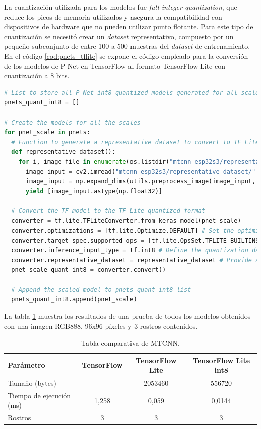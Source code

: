 La cuantización utilizada para los modelos fue \textit{full integer quantization}, que reduce los picos de memoria utilizados y asegura la compatibilidad con dispositivos de hardware que no pueden utilizar punto flotante. Para este tipo de cuantización se necesitó crear un \textit{dataset} representativo, compuesto por un pequeño subconjunto de entre 100 a 500 muestras del \textit{dataset} de entrenamiento. En el código \ref{cod:pnets_tflite} se expone el código empleado para la conversión de los modelos de P-Net en TensorFlow al formato TensorFlow Lite con cuantización a 8 bits.

\begin{lstlisting}[language=Python, label=cod:pnets_tflite, caption=Código para crear los modelos de P-Net con TensorFlow Lite con cuantización de 8 bits.]
# List to store all P-Net int8 quantized models generated for all scales
pnets_quant_int8 = []

# Create the models for all the scales
for pnet_scale in pnets:
  # Function to generate a representative dataset to convert to TF Lite quantized
  def representative_dataset():
    for i, image_file in enumerate(os.listdir("mtcnn_esp32s3/representative_dataset/")):
      image_input = cv2.imread("mtcnn_esp32s3/representative_dataset/" + image_file)
      image_input = np.expand_dims(utils.preprocess_image(image_input, hs, ws, np.float32), axis=0)
      yield [image_input.astype(np.float32)]

  # Convert the TF model to the TF Lite quantized format 
  converter = tf.lite.TFLiteConverter.from_keras_model(pnet_scale)
  converter.optimizations = [tf.lite.Optimize.DEFAULT] # Set the optimization flag
  converter.target_spec.supported_ops = [tf.lite.OpsSet.TFLITE_BUILTINS_INT8] # Enforce integer only quantization
  converter.inference_input_type = tf.int8 # Define the quantization data type
  converter.representative_dataset = representative_dataset # Provide a representative dataset to ensure we quantize correctly.
  pnet_scale_quant_int8 = converter.convert()

  # Append the scaled model to pnets_quant_int8 list
  pnets_quant_int8.append(pnet_scale)
\end{lstlisting}

La tabla \ref{tab:models_comp} muestra los resultados de una prueba de todos los modelos obtenidos con una imagen RGB888, 96x96 píxeles y 3 rostros contenidos.

\begin{table}[h]
	\centering
	\caption[Modelos comparativa]{Tabla comparativa de MTCNN.}
	\begin{tabular}{lccc}   
		\toprule
		\textbf{Parámetro} & \textbf{TensorFlow} & \textbf{TensorFlow Lite} & \textbf{TensorFlow Lite int8} \\
		\midrule
		Tamaño (bytes) & - & 2053460 &  556720 \\
		Tiempo de ejecución (ms) & 1,258 & 0,059 & 0,0144 \\
		Rostros & 3 & 3 & 3 \\
		\bottomrule
		\hline
	\end{tabular}
	\label{tab:models_comp}
\end{table}

